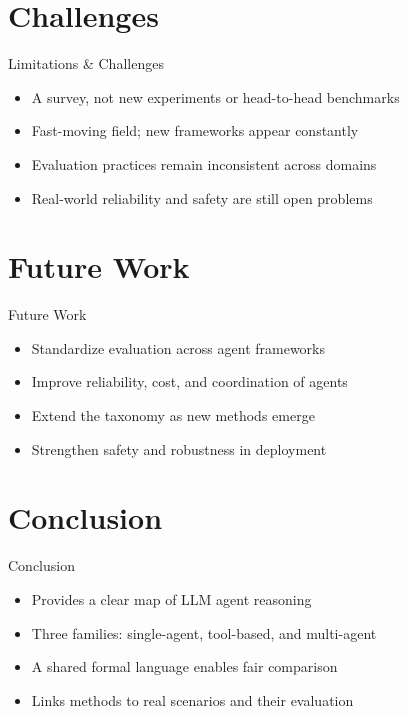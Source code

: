 \documentclass[10pt]{beamer}
\begin{document}
\section{Challenges}
\begin{frame}{Limitations \& Challenges}
\begin{itemize}
  \item A survey, not new experiments or head-to-head benchmarks
  \item Fast-moving field; new frameworks appear constantly
  \item Evaluation practices remain inconsistent across domains
  \item Real-world reliability and safety are still open problems
\end{itemize}
\end{frame}

\section{Future Work}
\begin{frame}{Future Work}
\begin{itemize}
  \item Standardize evaluation across agent frameworks
  \item Improve reliability, cost, and coordination of agents
  \item Extend the taxonomy as new methods emerge
  \item Strengthen safety and robustness in deployment
\end{itemize}
\end{frame}

\section{Conclusion}
\begin{frame}{Conclusion}
\begin{itemize}
  \item Provides a clear map of LLM agent reasoning
  \item Three families: single-agent, tool-based, and multi-agent
  \item A shared formal language enables fair comparison
  \item Links methods to real scenarios and their evaluation
\end{itemize}
\end{frame}
\end{document}
